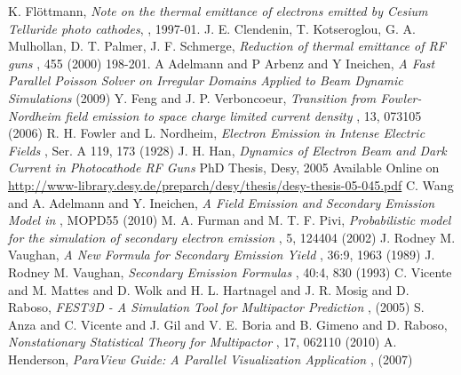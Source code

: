 \begin{thebibliography}{10}
K. Fl\"ottmann,
{\sl Note on the thermal emittance of electrons emitted by Cesium Telluride photo cathodes},
, 1997-01.
J. E. Clendenin, T. Kotseroglou, G. A. Mulhollan, D. T. Palmer, J. F. Schmerge,
{\sl Reduction of thermal emittance of RF guns}
, 455 (2000) 198-201.
A Adelmann and P Arbenz and Y Ineichen, 
{\sl A Fast Parallel Poisson Solver on Irregular Domains Applied to Beam  Dynamic Simulations}
 (2009)
 Y. Feng and J. P. Verboncoeur,
{\sl Transition from Fowler-Nordheim field emission to space charge limited current density}
, 13, 073105 (2006)
 R. H. Fowler and L. Nordheim, 
{\sl Electron Emission in Intense Electric Fields}
, Ser. A 119, 173 (1928)
 J. H. Han, 
{\sl Dynamics of Electron Beam and Dark Current in Photocathode RF Guns}
\newblock PhD Thesis, Desy, 2005 Available Online on \url{http://www-library.desy.de/preparch/desy/thesis/desy-thesis-05-045.pdf}
 C. Wang and A. Adelmann and Y. Ineichen,
{\sl A Field Emission and Secondary Emission Model in \opal}
, MOPD55 (2010) 
 M. A. Furman and M. T. F. Pivi,
{\sl Probabilistic model for the simulation of secondary electron emission}
, 5, 124404 (2002) 
 J. Rodney M. Vaughan,
{\sl A New Formula for Secondary Emission Yield}
, 36:9, 1963 (1989)  
 J. Rodney M. Vaughan,
{\sl Secondary Emission Formulas}
, 40:4, 830 (1993) 
 C. Vicente and M. Mattes and D. Wolk and H. L. Hartnagel and J. R. Mosig and D. Raboso,
{\sl FEST3D - A Simulation Tool for Multipactor Prediction}
, (2005)  
 S. Anza and C. Vicente and J. Gil and V. E. Boria and B. Gimeno and D. Raboso,
{\sl Nonstationary Statistical Theory for Multipactor}
, 17, 062110 (2010)
 A. Henderson,
{\sl ParaView Guide: A Parallel Visualization Application}
, (2007)  
\end{thebibliography}
